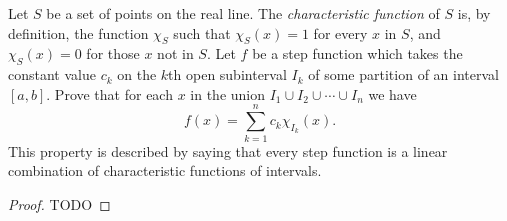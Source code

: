 \documentclass{article}
\begin{document}
Let $S$ be a set of points on the real line.
The \textit{characteristic function} of $S$ is, by definition, the function
  $\chi_S$ such that $\chi_S(x) = 1$ for every $x$ in $S$, and $\chi_S(x) = 0$
  for those $x$ not in $S$.
Let $f$ be a step function which takes the constant value $c_k$ on the $k$th
  open subinterval $I_k$ of some partition of an interval $[a, b]$.
Prove that for each $x$ in the union $I_1 \cup I_2 \cup \cdots \cup I_n$ we have
  $$f(x) = \sum_{k=1}^n c_k\chi_{I_k}(x).$$
This property is described by saying that every step function is a linear
  combination of characteristic functions of intervals.

\begin{proof}

  TODO

\end{proof}
\end{document}
